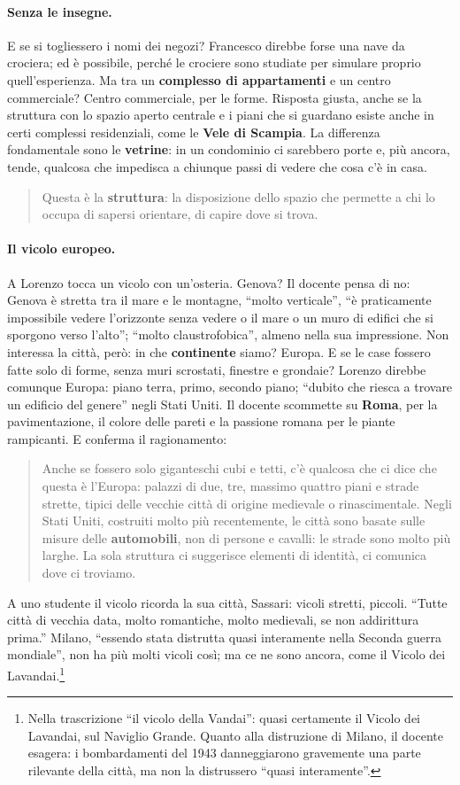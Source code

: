 \paragraph{Senza le insegne.} E se si togliessero i nomi dei negozi? Francesco direbbe
forse una nave da crociera; ed è possibile, perché le crociere sono studiate per simulare
proprio quell'esperienza. Ma tra un \textbf{complesso di appartamenti} e un centro
commerciale? Centro commerciale, per le forme. Risposta giusta, anche se la struttura con
lo spazio aperto centrale e i piani che si guardano esiste anche in certi complessi
residenziali, come le \textbf{Vele di Scampia}. La differenza fondamentale sono le
\textbf{vetrine}: in un condominio ci sarebbero porte e, più ancora, tende, qualcosa che
impedisca a chiunque passi di vedere che cosa c'è in casa.
\begin{quote}
Questa è la \textbf{struttura}: la disposizione dello spazio che permette a chi lo occupa
di sapersi orientare, di capire dove si trova.
\end{quote}

\paragraph{Il vicolo europeo.} A Lorenzo tocca un vicolo con un'osteria. Genova? Il
docente pensa di no: Genova è stretta tra il mare e le montagne, ``molto verticale'', ``è
praticamente impossibile vedere l'orizzonte senza vedere o il mare o un muro di edifici che
si sporgono verso l'alto''; ``molto claustrofobica'', almeno nella sua impressione. Non
interessa la città, però: in che \textbf{continente} siamo? Europa. E se le case fossero
fatte solo di forme, senza muri scrostati, finestre e grondaie? Lorenzo direbbe comunque
Europa: piano terra, primo, secondo piano; ``dubito che riesca a trovare un edificio del
genere'' negli Stati Uniti. Il docente scommette su \textbf{Roma}, per la pavimentazione,
il colore delle pareti e la passione romana per le piante rampicanti. E conferma il
ragionamento:
\begin{quote}
Anche se fossero solo giganteschi cubi e tetti, c'è qualcosa che ci dice che questa è
l'Europa: palazzi di due, tre, massimo quattro piani e strade strette, tipici delle
vecchie città di origine medievale o rinascimentale. Negli Stati Uniti, costruiti molto
più recentemente, le città sono basate sulle misure delle \textbf{automobili}, non di
persone e cavalli: le strade sono molto più larghe. La sola struttura ci suggerisce
elementi di identità, ci comunica dove ci troviamo.
\end{quote}
A uno studente il vicolo ricorda la sua città, Sassari: vicoli stretti, piccoli. ``Tutte
città di vecchia data, molto romantiche, molto medievali, se non addirittura prima.''
Milano, ``essendo stata distrutta quasi interamente nella Seconda guerra mondiale'', non ha
più molti vicoli così; ma ce ne sono ancora, come il Vicolo dei
Lavandai.\footnote{Nella trascrizione ``il vicolo della Vandai'': quasi certamente il
Vicolo dei Lavandai, sul Naviglio Grande. Quanto alla distruzione di Milano, il docente
esagera: i bombardamenti del 1943 danneggiarono gravemente una parte rilevante della
città, ma non la distrussero ``quasi interamente''.}

